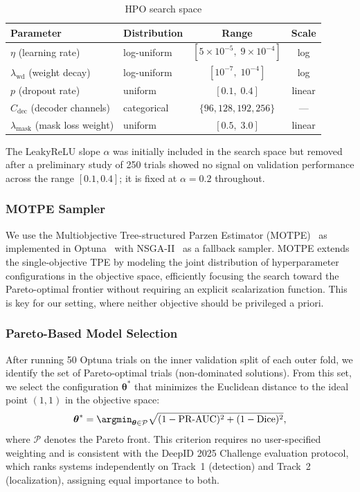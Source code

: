 \begin{table}[!t]
  \centering
  \caption{HPO search space}
  \label{tab:hpo_space}
  \begin{tabular}{llcc}
    \toprule
    Parameter & Distribution & Range & Scale \\
    \midrule
    $\eta$ (learning rate) & log-uniform & $[5\times10^{-5},\; 9\times10^{-4}]$ & log \\
    $\lambda_{\text{wd}}$ (weight decay) & log-uniform & $[10^{-7},\; 10^{-4}]$ & log \\
    $p$ (dropout rate) & uniform & $[0.1,\; 0.4]$ & linear \\
    $C_{\text{dec}}$ (decoder channels) & categorical & $\{96, 128, 192, 256\}$ & — \\
    $\lambda_{\text{mask}}$ (mask loss weight) & uniform & $[0.5,\; 3.0]$ & linear \\
    \bottomrule
  \end{tabular}
\end{table}

The LeakyReLU slope $\alpha$ was initially included in the search space but removed
after a preliminary study of 250 trials showed no signal on validation performance
across the range $[0.1, 0.4]$; it is fixed at $\alpha = 0.2$ throughout.

\subsubsection{MOTPE Sampler}

We use the Multiobjective Tree-structured Parzen Estimator
(MOTPE)~\cite{motpe2022} as implemented in Optuna~\cite{optuna2019} with NSGA-II~\cite{nsga2_2002}
as a fallback sampler. MOTPE extends the single-objective TPE by modeling
the joint distribution of hyperparameter configurations in the objective space,
efficiently focusing the search toward the Pareto-optimal frontier without
requiring an explicit scalarization function. This is key for our setting, where
neither objective should be privileged a priori.

\subsubsection{Pareto-Based Model Selection}

After running 50 Optuna trials on the inner validation split of each outer fold,
we identify the set of Pareto-optimal trials (non-dominated solutions). From this
set, we select the configuration $\boldsymbol{\theta}^*$ that minimizes the
Euclidean distance to the ideal point $(1, 1)$ in the objective space:
\begin{equation}
  \boldsymbol{\theta}^* = \argmin_{\boldsymbol{\theta} \in \mathcal{P}}
    \sqrt{(1 - \text{PR-AUC})^2 + (1 - \text{Dice})^2},
  \label{eq:ideal_point}
\end{equation}
where $\mathcal{P}$ denotes the Pareto front. This criterion requires no
user-specified weighting and is consistent with the DeepID 2025 Challenge
evaluation protocol, which ranks systems independently on Track~1 (detection)
and Track~2 (localization), assigning equal importance to both.

